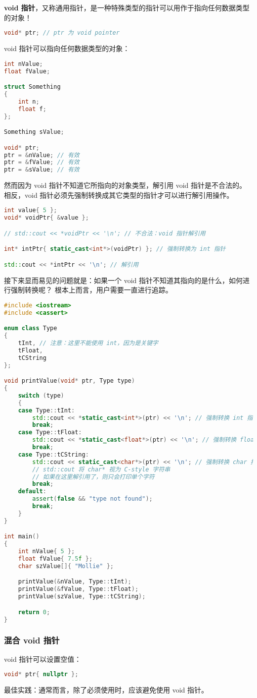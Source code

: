 \documentclass[../../LearnCpp.tex]{subfiles}
\begin{document}

\textbf{void 指针}，又称通用指针，是一种特殊类型的指针可以用作于指向任何数据类型的对象！

\begin{lstlisting}[language=C++]
void* ptr; // ptr 为 void pointer
\end{lstlisting}

void 指针可以指向任何数据类型的对象：

\begin{lstlisting}[language=C++]
int nValue;
float fValue;

struct Something
{
    int n;
    float f;
};

Something sValue;

void* ptr;
ptr = &nValue; // 有效
ptr = &fValue; // 有效
ptr = &sValue; // 有效
\end{lstlisting}

然而因为 void 指针不知道它所指向的对象类型，解引用 void 指针是不合法的。
相反，void 指针必须先强制转换成其它类型的指针才可以进行解引用操作。

\begin{lstlisting}[language=C++]
int value{ 5 };
void* voidPtr{ &value };

// std::cout << *voidPtr << '\n'; // 不合法：void 指针解引用

int* intPtr{ static_cast<int*>(voidPtr) }; // 强制转换为 int 指针

std::cout << *intPtr << '\n'; // 解引用
\end{lstlisting}

接下来显而易见的问题就是：如果一个 void 指针不知道其指向的是什么，如何进行强制转换呢？
根本上而言，用户需要一直进行追踪。

\begin{lstlisting}[language=C++]
#include <iostream>
#include <cassert>

enum class Type
{
    tInt, // 注意：这里不能使用 int，因为是关键字
    tFloat,
    tCString
};

void printValue(void* ptr, Type type)
{
    switch (type)
    {
    case Type::tInt:
        std::cout << *static_cast<int*>(ptr) << '\n'; // 强制转换 int 指针并解引用
        break;
    case Type::tFloat:
        std::cout << *static_cast<float*>(ptr) << '\n'; // 强制转换 float 指针并解引用
        break;
    case Type::tCString:
        std::cout << static_cast<char*>(ptr) << '\n'; // 强制转换 char 指针（无解引用）
        // std::cout 将 char* 视为 C-style 字符串
        // 如果在这里解引用了，则只会打印单个字符
        break;
    default:
        assert(false && "type not found");
        break;
    }
}

int main()
{
    int nValue{ 5 };
    float fValue{ 7.5f };
    char szValue[]{ "Mollie" };

    printValue(&nValue, Type::tInt);
    printValue(&fValue, Type::tFloat);
    printValue(szValue, Type::tCString);

    return 0;
}
\end{lstlisting}

\subsubsection*{混合 void 指针}

void 指针可以设置空值：

\begin{lstlisting}[language=C++]
void* ptr{ nullptr };
\end{lstlisting}

最佳实践：通常而言，除了必须使用时，应该避免使用 void 指针。
\end{document}
